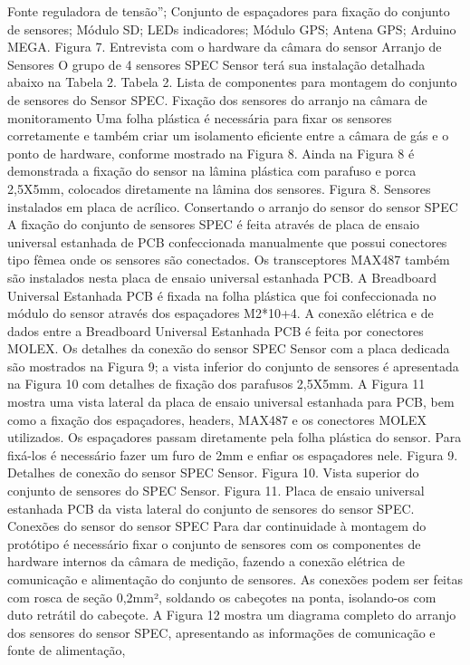 Fonte reguladora de tensão”;
Conjunto de espaçadores para fixação do conjunto de sensores;
Módulo SD;
LEDs indicadores;
Módulo GPS;
Antena GPS;
Arduino MEGA.
Figura 7. Entrevista com o hardware da câmara do sensor
Arranjo de Sensores
O grupo de 4 sensores SPEC Sensor terá sua instalação detalhada abaixo na Tabela 2.
Tabela 2. Lista de componentes para montagem do conjunto de sensores do Sensor SPEC.
Fixação dos sensores do arranjo na câmara de monitoramento
Uma folha plástica é necessária para fixar os sensores corretamente e também criar um isolamento eficiente entre a câmara de gás e o ponto de hardware, conforme mostrado na Figura 8.
Ainda na Figura 8 é demonstrada a fixação do sensor na lâmina plástica com parafuso e porca 2,5X5mm, colocados diretamente na lâmina dos sensores.
Figura 8. Sensores instalados em placa de acrílico.
Consertando o arranjo do sensor do sensor SPEC
A fixação do conjunto de sensores SPEC é feita através de placa de ensaio universal estanhada de PCB confeccionada manualmente que possui conectores tipo fêmea onde os sensores são conectados. Os transceptores MAX487 também são instalados nesta placa de ensaio universal estanhada PCB. A Breadboard Universal Estanhada PCB é fixada na folha plástica que foi confeccionada no módulo do sensor através dos espaçadores M2*10+4. A conexão elétrica e de dados entre a Breadboard Universal Estanhada PCB é feita por conectores MOLEX.
Os detalhes da conexão do sensor SPEC Sensor com a placa dedicada são mostrados na Figura 9; a vista inferior do conjunto de sensores é apresentada na Figura 10 com detalhes de fixação dos parafusos 2,5X5mm. A Figura 11 mostra uma vista lateral da placa de ensaio universal estanhada para PCB, bem como a fixação dos espaçadores, headers, MAX487 e os conectores MOLEX utilizados.
Os espaçadores passam diretamente pela folha plástica do sensor. Para fixá-los é necessário fazer um furo de 2mm e enfiar os espaçadores nele.
Figura 9. Detalhes de conexão do sensor SPEC Sensor.
Figura 10. Vista superior do conjunto de sensores do SPEC Sensor.
Figura 11. Placa de ensaio universal estanhada PCB da vista lateral do conjunto de sensores do sensor SPEC.
Conexões do sensor do sensor SPEC
Para dar continuidade à montagem do protótipo é necessário fixar o conjunto de sensores com os componentes de hardware internos da câmara de medição, fazendo a conexão elétrica de comunicação e alimentação do conjunto de sensores.
As conexões podem ser feitas com rosca de seção 0,2mm², soldando os cabeçotes na ponta, isolando-os com duto retrátil do cabeçote. A Figura 12 mostra um diagrama completo do arranjo dos sensores do sensor SPEC, apresentando as informações de comunicação e fonte de alimentação,

